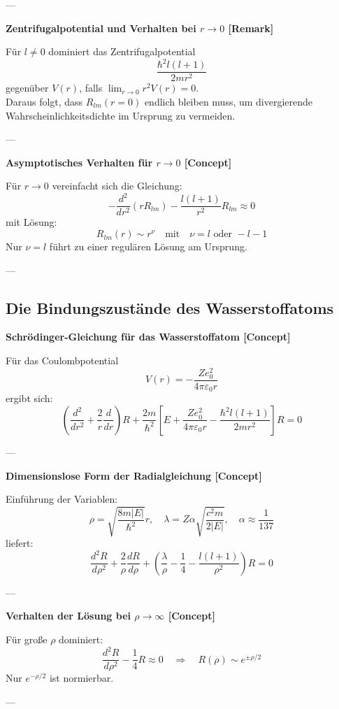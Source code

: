 \documentclass[10pt, letterpaper]{article}
\begin{document}
---

\textbf{Zentrifugalpotential und Verhalten bei $r \to 0$ [Remark]}

Für $l \neq 0$ dominiert das Zentrifugalpotential
\[
\frac{\hbar^2 l(l+1)}{2 m r^2}
\]
gegenüber $V(r)$, falls $\lim_{r \to 0} r^2 V(r) = 0$.\\
Daraus folgt, dass $R_{lm}(r=0)$ endlich bleiben muss, um divergierende Wahrscheinlichkeitsdichte im Ursprung zu vermeiden.

---

\textbf{Asymptotisches Verhalten für $r \to 0$ [Concept]}

Für $r \to 0$ vereinfacht sich die Gleichung:
\[
-\frac{d^2}{d r^2}(r R_{lm}) - \frac{l(l+1)}{r^2} R_{lm} \approx 0
\]
mit Lösung:
\[
R_{lm}(r) \sim r^\nu \quad \text{mit} \quad \nu = l \text{ oder } -l-1
\]
Nur $\nu = l$ führt zu einer regulären Lösung am Ursprung.

---


\pagebreak


\subsection{Die Bindungszustände des Wasserstoffatoms}

\textbf{Schrödinger-Gleichung für das Wasserstoffatom [Concept]}

Für das Coulombpotential
\[
V(r) = -\frac{Z e_0^2}{4\pi \varepsilon_0 r}
\]
ergibt sich:
\[
\left( \frac{d^2}{dr^2} + \frac{2}{r} \frac{d}{dr} \right) R + \frac{2m}{\hbar^2} \left[ E + \frac{Z e_0^2}{4\pi \varepsilon_0 r} - \frac{\hbar^2 l(l+1)}{2 m r^2} \right] R = 0
\]

---

\textbf{Dimensionslose Form der Radialgleichung [Concept]}

Einführung der Variablen:
\[
\rho = \sqrt{\frac{8 m |E|}{\hbar^2}} r, \quad \lambda = Z \alpha \sqrt{\frac{c^2 m}{2|E|}}, \quad \alpha \approx \frac{1}{137}
\]
liefert:
\[
\frac{d^2 R}{d \rho^2} + \frac{2}{\rho} \frac{d R}{d \rho} + \left( \frac{\lambda}{\rho} - \frac{1}{4} - \frac{l(l+1)}{\rho^2} \right) R = 0
\]

---

\textbf{Verhalten der Lösung bei $\rho \to \infty$ [Concept]}

Für große $\rho$ dominiert:
\[
\frac{d^2 R}{d \rho^2} - \frac{1}{4} R \approx 0 \quad \Rightarrow \quad R(\rho) \sim e^{\pm \rho/2}
\]
Nur $e^{-\rho/2}$ ist normierbar.

---
\end{document}
